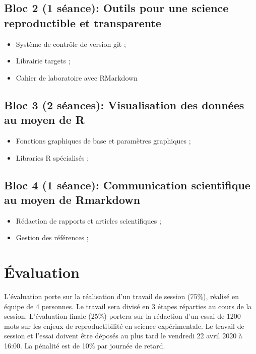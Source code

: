 \documentclass[12]{article}
\begin{document}
	\subsection*{Bloc 2 (1 séance): Outils pour une science reproductible et transparente}

	\begin{itemize}
	\renewcommand{\labelitemi}{$\bullet$}	
		\item Système de contrôle de version git ;
		\item Librairie targets ; 
		\item Cahier de laboratoire avec RMarkdown
	\end{itemize}


	\subsection*{Bloc 3 (2 séances): Visualisation des données au moyen de R}

	\begin{itemize}
	\renewcommand{\labelitemi}{$\bullet$}	
		\item Fonctions graphiques de base et paramètres graphiques ;
		\item Libraries R spécialisés ;
	\end{itemize}


	\subsection*{Bloc 4 (1 séance): Communication scientifique au moyen de Rmarkdown}

	\begin{itemize}
	\renewcommand{\labelitemi}{$\bullet$}	
		\item Rédaction de rapports et articles scientifiques ;
		\item Gestion des références ;
	\end{itemize}


	\section*{Évaluation}

	L'évaluation porte sur la réalisation d'un travail de session (75\%), réalisé en équipe de 4 personnes. Le travail sera divisé en 3 étapes réparties au cours de la session. L'évaluation finale (25\%) portera sur la rédaction d'un essai de 1200 mots sur les enjeux de reproductibilité en science expérimentale. Le travail de session et l'essai doivent être déposés au plus tard le vendredi 22 avril 2020 à 16:00. La pénalité est de 10\% par journée de retard.  
\end{document}
